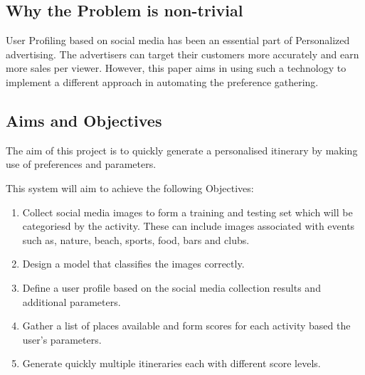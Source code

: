 \subsection{Why the Problem is non-trivial}

        User Profiling based on social media has been an essential
        part of Personalized advertising. The advertisers can target
        their customers more accurately and earn more sales per
        viewer\cite{article}. However, this paper aims in using such a
        technology to implement a different approach in automating 
        the preference gathering.

\subsection{Aims and Objectives}
        
        The aim of this project is to quickly generate a personalised
        itinerary by making use of preferences and parameters. 

        This system will aim to achieve the following Objectives:
        \begin{enumerate}
                \item Collect social media images to form a training
                and testing set which will be categoriesd by the
                activity. These can include images associated with
                events such as, nature, beach, sports, food, bars and
                clubs.
                \item Design a model that classifies the images
                correctly.
                \item Define a user profile based on the social media
                collection results and additional parameters.
                \item Gather a list of places available and form
                scores for each activity based the user's parameters.
                \item Generate quickly multiple itineraries each with
                different score levels.
        \end{enumerate}
